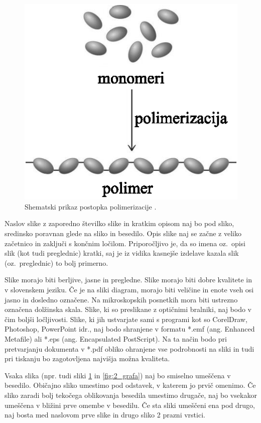 \begin{figure}[ht!]
	\begin{centering}
		\includegraphics[scale=1.0]{slike/neke_molekule}
		\caption{Shematski prikaz postopka polimerizacije \cite{Doe_1991,Bazant_2008}.} \label{fig:neke_molekule}
	\end{centering}
\end{figure}

Naslov slike z zaporedno številko slike in kratkim opisom naj bo pod sliko, sredinsko poravnan glede na sliko in besedilo. Opis slike naj se začne z veliko začetnico in zaključi s končnim ločilom. Priporočljivo je, da so imena oz.\ opisi slik (kot tudi preglednic) kratki, saj je iz vidika kasnejše izdelave kazala slik (oz.\ preglednic) to bolj primerno.

Slike morajo biti berljive, jasne in pregledne. Slike morajo biti dobre kvalitete in v slovenskem jeziku. Če je na sliki diagram, morajo biti veličine in enote vseh osi jasno in dosledno označene. Na mikroskopskih posnetkih mora biti ustrezno označena dolžinska skala. Slike, ki so preslikane z optičnimi bralniki, naj bodo v čim boljši ločljivosti. Slike, ki jih ustvarjate sami s programi kot so CorelDraw, Photoshop, PowerPoint idr., naj bodo shranjene v formatu *.emf (ang. Enhanced Metafile) ali *.eps (ang. Encapsulated PostScript). Na ta način bodo pri pretvarjanju dokumenta v *.pdf obliko ohranjene vse podrobnosti na sliki in tudi pri tiskanju bo zagotovljena najvišja možna kvaliteta.


Vsaka slika (npr. tudi sliki \ref{fig:neke_molekule} in \ref{fig:2_grafa}) naj bo smiselno umeščena v besedilo. Običajno sliko umestimo pod odstavek, v katerem jo prvič omenimo. Če sliko zaradi bolj tekočega oblikovanja besedila umestimo drugače, naj bo vsekakor umeščena v bližini prve omembe v besedilu. Če sta sliki umeščeni ena pod drugo, naj bosta med naslovom prve slike in drugo sliko 2 prazni vrstici.


